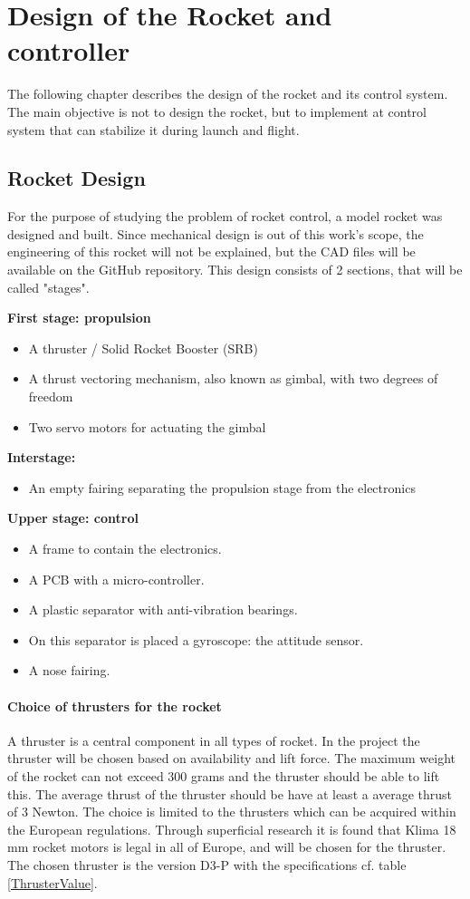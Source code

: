 
\chapter{Design of the Rocket and controller}
The following chapter describes the design of the rocket and its control system. The main objective is not to design the rocket, but to implement at control system that can stabilize it during launch and flight. 

\section{Rocket Design}
For the purpose of studying the problem of rocket control, a model rocket was designed and built. Since mechanical design is out of this work's scope, the engineering of this rocket will not be explained, but the CAD files will be available on the GitHub repository.
This design consists of 2 sections, that will be called "stages".


\textbf{First stage: propulsion}
\begin{itemize}[noitemsep]
	\item {A thruster / Solid Rocket Booster (SRB)}
	\item {A thrust vectoring mechanism, also known as gimbal, with two degrees of freedom}
	\item {Two servo motors for actuating the gimbal}
\end{itemize}

\textbf{Interstage:}
\begin{itemize}[noitemsep]
	\item {An empty fairing separating the propulsion stage from the electronics}
\end{itemize}
\textbf{Upper stage: control}
\begin{itemize}[noitemsep]
	\item A frame to contain the electronics.
	\item A PCB with a micro-controller.
	\item A plastic separator with anti-vibration bearings.
	\item On this separator is placed a gyroscope: the attitude sensor.
	\item A nose fairing.
\end{itemize}

\subsubsection*{Choice of thrusters for the rocket}
A thruster is a central component in all types of rocket. In the project the thruster will be chosen based on availability and lift force. The maximum weight of the rocket can not exceed 300 grams and the thruster should be able to lift this. The average thrust of the thruster should be have at least a average thrust of 3 Newton. The choice is limited to the thrusters which can be acquired within the European regulations. Through superficial research it is found that Klima 18 mm rocket motors is legal in all of Europe, and will be chosen for the thruster. The chosen thruster is the version D3-P with the specifications cf. table \ref{ThrusterValue}.

